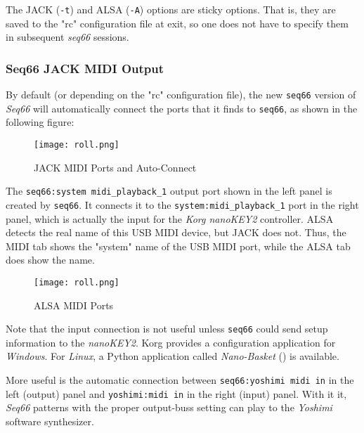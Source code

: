    The JACK (\texttt{-t}) and ALSA (\texttt{-A}) options are sticky options.
   That is, they are saved to the "rc" configuration file at exit,
   so one does not have to specify them in subsequent \textsl{seq66} sessions.

\subsubsection{Seq66 JACK MIDI Output}
\label{subsubsec:jack_midi_output}

   By default (or depending on the "rc" configuration file), the new
   \texttt{seq66} version of \textsl{Seq66} will
   automatically connect the ports that it finds to \texttt{seq66},
   as shown in the following figure:

\begin{figure}[H]
   \centering 
   \texttt{[image: roll.png]}
   \caption{JACK MIDI Ports and Auto-Connect}
   \label{fig:jack_nano_yosh_midi_auto}
\end{figure}

   The \texttt{seq66:system midi\_playback\_1} output port shown
   in the left panel is created by \texttt{seq66}.  It connects it to the 
   \texttt{system:midi\_playback\_1} port in the right panel, which
   is actually the input for the \textsl{Korg nanoKEY2} controller.
   ALSA detects the real name of this USB MIDI device, but JACK does not.  
   Thus, the MIDI tab shows the "system" name of the USB MIDI port, while
   the ALSA tab does show the name.

\begin{figure}[H]
   \centering 
   \texttt{[image: roll.png]}
   \caption{ALSA MIDI Ports}
   \label{fig:jack_nano_yosh_alsa_pre}
\end{figure}

	Note that the input connection is not useful unless \texttt{seq66} could
   send setup information to the \textsl{nanoKEY2}.
   Korg provides a configuration application for \textsl{Windows}.
   For \textsl{Linux}, a Python application called \textsl{Nano-Basket}
	(\cite{nanobasket}) is available.

   More useful is the automatic connection between
   \texttt{seq66:yoshimi midi in} in the left (output) panel and
   \texttt{yoshimi:midi in} in the right (input) panel.  With it it,
   \textsl{Seq66} patterns with the proper output-buss setting can play
   to the \textsl{Yoshimi} software synthesizer.

